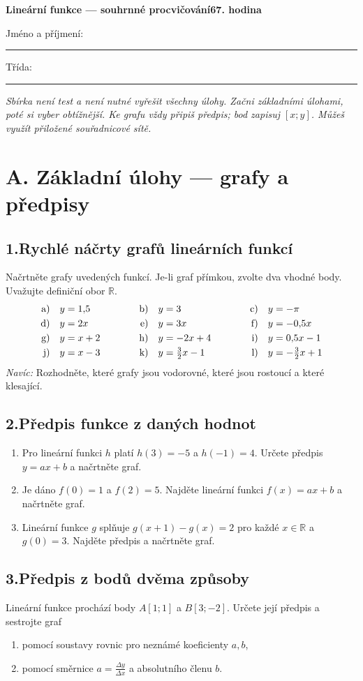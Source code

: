 \documentclass[11pt,a4paper]{article}
\newcommand{\uloha}[2]{\par\needspace{4\baselineskip}\subsection*{#1\enspace #2}}
\begin{document}
{\Large\bfseries Lineární funkce --- souhrnné procvičování}\hfill\textbf{67. hodina}
\par\vspace{1mm}Jméno a příjmení: \rule{62mm}{.4pt}\hfill Třída: \rule{19mm}{.4pt}
\smallskip
\textit{Sbírka není test a není nutné vyřešit všechny úlohy. Začni základními úlohami, poté si vyber obtížnější. Ke grafu vždy připiš předpis; bod zapisuj $[x;y]$. Můžeš využít přiložené souřadnicové sítě.}
\section*{A. Základní úlohy --- grafy a předpisy}
\uloha{1.}{Rychlé náčrty grafů lineárních funkcí}
Načrtněte grafy uvedených funkcí. Je-li graf přímkou, zvolte dva vhodné body. Uvažujte definiční obor $\mathbb R$.
\[
\begin{array}{r@{\quad}l@{\qquad\qquad}r@{\quad}l@{\qquad\qquad}r@{\quad}l}
\mathrm{a)}&y=1{,}5&\mathrm{b)}&y=3&\mathrm{c)}&y=-\pi\\[3pt]
\mathrm{d)}&y=2x&\mathrm{e)}&y=3x&\mathrm{f)}&y=-0{,}5x\\[3pt]
\mathrm{g)}&y=x+2&\mathrm{h)}&y=-2x+4&\mathrm{i)}&y=0{,}5x-1\\[3pt]
\mathrm{j)}&y=x-3&\mathrm{k)}&y=\frac32x-1&\mathrm{l)}&y=-\frac32x+1
\end{array}
\]
\textit{Navíc:} Rozhodněte, které grafy jsou vodorovné, které jsou rostoucí a které klesající.
\uloha{2.}{Předpis funkce z daných hodnot}
\begin{enumerate}[label=\alph*)]
\item Pro lineární funkci $h$ platí $h(3)=-5$ a $h(-1)=4$. Určete předpis $y=ax+b$ a načrtněte graf.
\item Je dáno $f(0)=1$ a $f(2)=5$. Najděte lineární funkci $f(x)=ax+b$ a načrtněte graf.
\item Lineární funkce $g$ splňuje $g(x+1)-g(x)=2$ pro každé $x\in\mathbb R$ a $g(0)=3$. Najděte předpis a načrtněte graf.
\end{enumerate}
\uloha{3.}{Předpis z bodů dvěma způsoby}
Lineární funkce prochází body $A[1;1]$ a $B[3;-2]$. Určete její předpis a sestrojte graf
\begin{enumerate}[label=\alph*)]
\item pomocí soustavy rovnic pro neznámé koeficienty $a,b$,
\item pomocí směrnice $a=\frac{\Delta y}{\Delta x}$ a absolutního členu $b$.
\end{enumerate}
\end{document}
